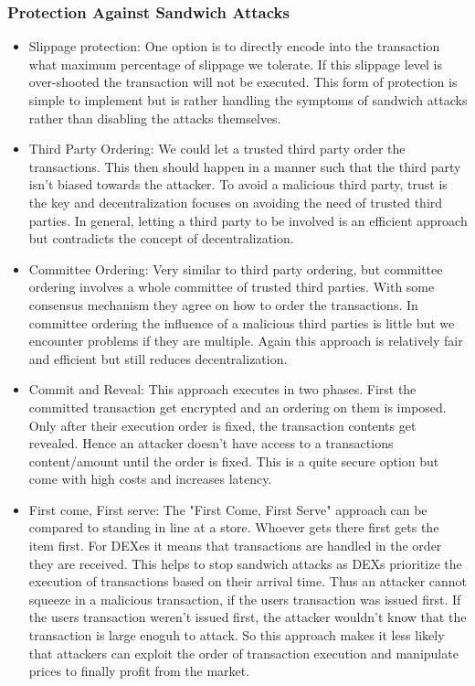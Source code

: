 \documentclass{article}
\begin{document}
\subsubsection{Protection Against Sandwich Attacks}
\begin{itemize}
\item {Slippage protection}: One option is to directly encode into the transaction what maximum percentage of slippage we tolerate. If this slippage level is over-shooted the transaction will not be executed. This form of protection is simple to implement but is rather handling the symptoms of sandwich attacks rather than disabling  the attacks themselves.
\item {Third Party Ordering}: We could let a trusted third party order the transactions. This then should happen in a manner such that the third party isn't biased towards the attacker. To avoid a malicious third party, trust is the key and decentralization focuses on avoiding the need of trusted third parties. In general, letting a third party to be involved is an efficient approach but contradicts the concept of decentralization.
\item {Committee Ordering}: Very similar to third party ordering, but committee ordering involves a whole committee of trusted third parties. With some consensus mechanism they agree on how to order the transactions. In committee ordering the influence of a malicious third parties is little but we encounter problems if they are multiple. Again this approach is relatively fair and efficient but still reduces decentralization.
\item {Commit and Reveal}: This approach executes in two phases. First the committed transaction get encrypted and an ordering on them is imposed. Only after their execution order is fixed, the transaction contents get revealed. Hence an attacker doesn't have access to a transactions content/amount until the order is fixed. This is a quite secure option but come with high costs and increases latency.
\item {First come, First serve}:
The "First Come, First Serve" approach can be compared to standing in line at a store. Whoever gets there first gets the item first. For DEXes it means that transactions are handled in the order they are received. This helps to stop sandwich attacks as DEXs prioritize the execution of transactions based on their arrival time. Thus an attacker cannot squeeze in a malicious transaction, if the users transaction was issued first. If the users transaction weren't issued first, the attacker wouldn't know that the transaction is large enoguh to attack. So this approach makes it less likely that attackers can exploit the order of transaction execution and manipulate prices to finally profit from the market.
\end{itemize}
\end{document}

